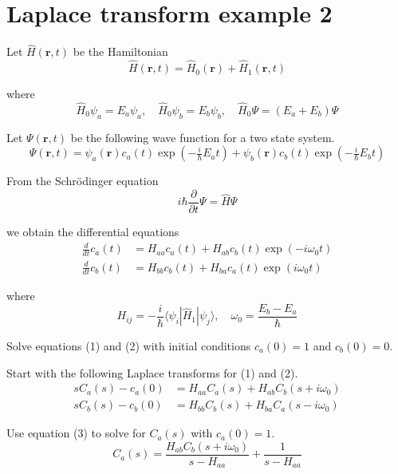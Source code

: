 

\section*{Laplace transform example 2}

Let $\hat H(\mathbf r,t)$ be the Hamiltonian
\begin{equation*}
\hat H(\mathbf r,t)=\hat H_0(\mathbf r)+\hat H_1(\mathbf r,t)
\end{equation*}

where
\begin{equation*}
\hat H_0\psi_a=E_a\psi_a,\quad\hat H_0\psi_b=E_b\psi_b,\quad
\hat H_0\Psi=(E_a+E_b)\Psi
\end{equation*}

Let $\Psi(\mathbf r,t)$ be the following wave function for a two state system.
\begin{equation*}
\Psi(\mathbf r,t)=\psi_a(\mathbf r)c_a(t)\exp(-\tfrac{i}{\hbar}E_at)+
\psi_b(\mathbf r)c_b(t)\exp(-\tfrac{i}{\hbar}E_bt)
\end{equation*}

From the Schr\"odinger equation
\begin{equation*}
i\hbar\frac{\partial}{\partial t}\Psi=\hat H\Psi
\end{equation*}

we obtain the differential equations
\begin{align*}
\frac{d}{dt}c_a(t)&=H_{aa}c_a(t)+H_{ab}c_b(t)\exp(-i\omega_0t)
\tag{1}
\\[1ex]
\frac{d}{dt}c_b(t)&=H_{bb}c_b(t)+H_{ba}c_a(t)\exp(i\omega_0t)
\tag{2}
\end{align*}

where
\begin{equation*}
H_{ij}=-\frac{i}{\hbar}\langle\psi_i|\hat H_1|\psi_j\rangle,\quad
\omega_0=\frac{E_b-E_a}{\hbar}
\end{equation*}

Solve equations (1) and (2) with initial conditions $c_a(0)=1$ and $c_b(0)=0$.

\bigskip
Start with the following Laplace transforms for (1) and (2).
\begin{align*}
sC_a(s)-c_a(0)&=H_{aa}C_a(s)+H_{ab}C_b(s+i\omega_0)
\tag{3}
\\
sC_b(s)-c_b(0)&=H_{bb}C_b(s)+H_{ba}C_a(s-i\omega_0)
\tag{4}
\end{align*}

Use equation (3) to solve for $C_a(s)$ with $c_a(0)=1$.
\begin{equation*}
C_a(s)=\frac{H_{ab}C_b(s+i\omega_0)}{s-H_{aa}}+\frac{1}{s-H_{aa}}
\end{equation*}

